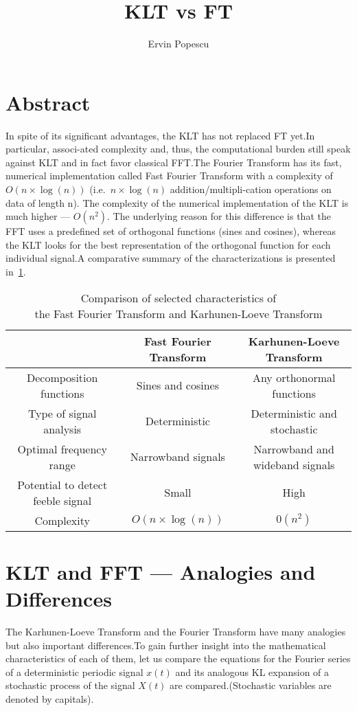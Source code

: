 \documentclass[12pt]{report}
\author{Ervin Popescu}
\title{KLT vs FT}
\date{}
\begin{document}
\maketitle
\section*{Abstract}
In spite of its significant advantages, the KLT has not replaced FT yet.\@ In particular, associ-ated complexity and, thus, the computational burden still speak against KLT and in fact favor classical FFT.\@ The Fourier Transform has its fast, numerical implementation called Fast Fourier Transform with a complexity of \(O(n\times\log(n))\) (i.e.\ \(n\times\log(n)\) addition/multipli-cation operations on data of length n).
The complexity of the numerical implementation of the KLT is much higher — \(O(n^2)\).
The underlying reason for this difference is that the FFT uses a predefined set of orthogonal functions (sines and cosines), 
whereas the KLT looks for the best representation of the orthogonal function for each individual signal.\@ A comparative summary of the characterizations is presented in~\ref{table:1}.
\begin{table}[H]
	\centering
	\begin{tabular}{ |c | c | c| }
	\hline
	\ & Fast Fourier Transform & Karhunen-Loeve Transform \\
	\hline
	Decomposition functions & Sines and cosines & Any orthonormal functions \\ 
	\hline
	Type of signal analysis & Deterministic & Deterministic and stochastic \\
	\hline
	Optimal frequency range & Narrowband signals & Narrowband and wideband signals \\
	\hline
	Potential to detect feeble signal & Small & High \\
	\hline
	Complexity & $O(n\times\log(n))$ & $0(n^2)$ \\
	\hline
	\end{tabular}
	\caption{Comparison of selected characteristics of \\the Fast Fourier Transform and Karhunen-Loeve Transform}
	\label{table:1}
\end{table}
\section*{KLT and FFT --- Analogies and Differences}
The Karhunen-Loeve Transform and the Fourier Transform have many analogies but also important differences.\@ To gain further insight into the mathematical characteristics of each of them, let us compare the equations for the Fourier series of a deterministic periodic signal \(x(t)\) and its analogous KL expansion of a stochastic process of the signal \(X(t)\) are compared.\@ (Stochastic variables are denoted by capitals).
\end{document}

